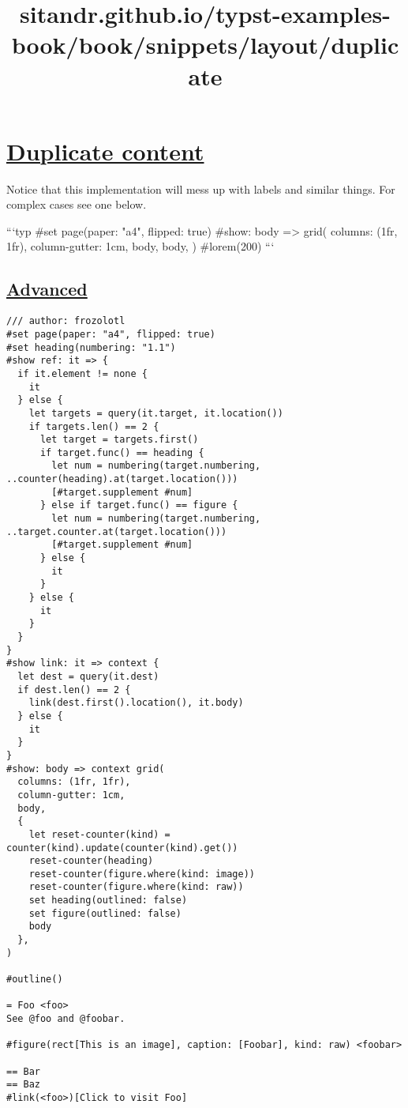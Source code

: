 \title{sitandr.github.io/typst-examples-book/book/snippets/layout/duplicate}

\section{\texorpdfstring{\hyperref[duplicate-content]{Duplicate
content}}{Duplicate content}}\label{duplicate-content}

Notice that this implementation will mess up with labels and similar
things. For complex cases see one below.

```typ \#set page(paper: "a4", flipped: true) \#show: body
=\textgreater{} grid( columns: (1fr, 1fr), column-gutter: 1cm, body,
body, ) \#lorem(200) ```

\subsection{\texorpdfstring{\hyperref[advanced]{Advanced}}{Advanced}}\label{advanced}

\begin{verbatim}
/// author: frozolotl
#set page(paper: "a4", flipped: true)
#set heading(numbering: "1.1")
#show ref: it => {
  if it.element != none {
    it
  } else {
    let targets = query(it.target, it.location())
    if targets.len() == 2 {
      let target = targets.first()
      if target.func() == heading {
        let num = numbering(target.numbering, ..counter(heading).at(target.location()))
        [#target.supplement #num]
      } else if target.func() == figure {
        let num = numbering(target.numbering, ..target.counter.at(target.location()))
        [#target.supplement #num]
      } else {
        it
      }
    } else {
      it
    }
  }
}
#show link: it => context {
  let dest = query(it.dest)
  if dest.len() == 2 {
    link(dest.first().location(), it.body)
  } else {
    it
  }
}
#show: body => context grid(
  columns: (1fr, 1fr),
  column-gutter: 1cm,
  body,
  {
    let reset-counter(kind) = counter(kind).update(counter(kind).get())
    reset-counter(heading)
    reset-counter(figure.where(kind: image))
    reset-counter(figure.where(kind: raw))
    set heading(outlined: false)
    set figure(outlined: false)
    body
  },
)

#outline()

= Foo <foo>
See @foo and @foobar.

#figure(rect[This is an image], caption: [Foobar], kind: raw) <foobar>

== Bar
== Baz
#link(<foo>)[Click to visit Foo]
\end{verbatim}

\pandocbounded{}
